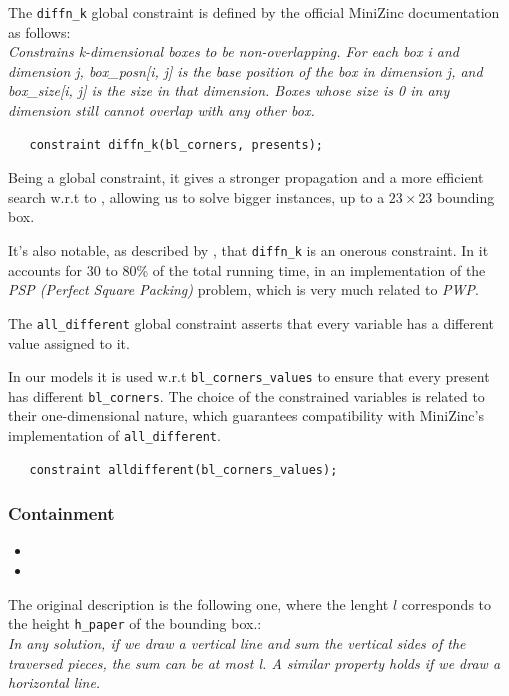 \documentclass[a4paper,10pt]{article}
\newcounter{subsubsubsection}[subsubsection]
\begin{document}
 \label{sec:diffnk}
The \texttt{diffn\_k} global constraint is defined by the official MiniZinc documentation \cite{minizinc} as follows: \\
\emph{Constrains k-dimensional boxes to be non-overlapping. For each box i and dimension j, box\_posn[i, j] is the base position of the box in dimension j, and box\_size[i, j] is the size in that dimension. Boxes whose size is 0 in any dimension still cannot overlap with any other box.}
\begin{verbatim}
   constraint diffn_k(bl_corners, presents);
\end{verbatim}
Being a global constraint, it gives a stronger propagation and a more efficient search w.r.t to , allowing us to solve bigger instances, up to a $23 \times 23$ bounding box.

It's also notable, as described by \cite{sweep}, that \texttt{diffn\_k} is an onerous constraint. In \cite{sweep} it accounts for 30 to 80\% of the total running time, in an implementation of the \emph{PSP (Perfect Square Packing)} problem, which is very much related to \emph{PWP}.

 \label{sec:different-bl-corners}
The \texttt{all\_different} global constraint asserts that every variable has a different value assigned to it.

In our models it is used w.r.t \texttt{bl\_corners\_values} to ensure that every present has different \texttt{bl\_corners}. The choice of the constrained variables is related to their one-dimensional nature, which guarantees compatibility with MiniZinc's implementation of \texttt{all\_different}.
\begin{verbatim}
   constraint alldifferent(bl_corners_values);
\end{verbatim}

\subsubsection{Containment}
\begin{itemize}
   \item {}
   \item {}
\end{itemize}

 \label{sec:reduce-presents-domains}
The original description is the following one, where the lenght $l$ corresponds to the height \texttt{h\_paper} of the bounding box.:\\
\emph{In any solution, if we draw a vertical line and sum the vertical sides of the traversed pieces, the sum can be at most l. A similar property holds if we draw a horizontal line.}
\end{document}
